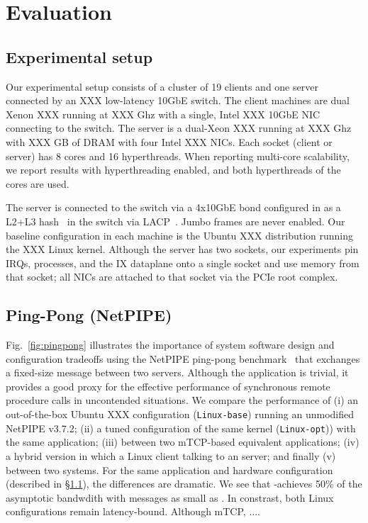 
\section{Evaluation}
\label{sec:eval}

\subsection{Experimental setup}
\label{sec:eval:setup}


Our experimental setup consists of a cluster of 19 clients and one
server connected by an XXX low-latency 10GbE switch.  The client
machines are dual Xenon XXX running at XXX Ghz with a single, Intel
XXX 10GbE NIC connecting to the switch.  The server is a dual-Xeon XXX
running at XXX Ghz with XXX GB of DRAM with four Intel XXX NICs.  Each
socket (client or server) has 8 cores and 16 hyperthreads.  When
reporting multi-core scalability, we report results with
hyperthreading enabled, and both hyperthreads of the cores are used.

The server is connected to
the switch via a 4x10GbE bond configured in as a L2+L3
hash~\cite{missing} in the switch via LACP~\cite{ieee802.3ad}.  Jumbo
frames are never enabled.  Our baseline configuration in each machine
is the Ubuntu XXX distribution running the XXX Linux kernel.  Although
the server has two sockets, our experiments pin IRQs, processes, and
the IX dataplane onto a single socket and use memory from that socket;
all NICs are attached to that socket via the PCIe root complex.

\subsection{Ping-Pong (NetPIPE)}




Fig.~\ref{fig:pingpong} illustrates the importance of system software
design and configuration tradeoffs using the NetPIPE ping-pong
benchmark~\cite{snell1996netpipe} that exchanges a fixed-size message
between two servers.  Although the application is trivial, it provides
a good proxy for the effective performance of synchronous remote
procedure calls in uncontended situations.  We compare the performance
of (i) an out-of-the-box Ubuntu XXX configuration
(\texttt{Linux-base}) running an unmodified NetPIPE v3.7.2; (ii) a
tuned configuration of the same kernel (\texttt{Linux-opt})) with the
same application; (iii) between two mTCP-based equivalent
applications; (iv) a hybrid version in which a Linux client talking to
an \ix server; and finally (v) between two \ix systems.  For the same
application and hardware configuration (described in
\S\ref{sec:eval:setup}), the differences are dramatic.  We see that
\ix-\ix achieves 50\% of the asymptotic bandwdith with messages as small
as .  In constrast, both Linux configurations remain
latency-bound.  Although mTCP, ....


